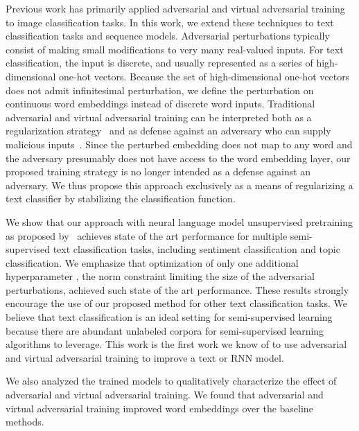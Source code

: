 \documentclass{article}
\begin{document}
Previous work has primarily applied adversarial and virtual adversarial training to image
classification tasks.
In this work, we extend these techniques to text
classification tasks and sequence models.
Adversarial perturbations typically consist of making small modifications to very
many real-valued inputs.
For text classification, the input is discrete, and usually represented as
a series of high-dimensional one-hot vectors.
Because the set of high-dimensional one-hot vectors does not admit infinitesimal
perturbation, we define the perturbation on continuous word embeddings instead of discrete
word inputs.
Traditional adversarial and virtual adversarial training can be interpreted both as a regularization
strategy~\cite[]{szegedy2013intriguing, goodfellow2014explaining,
miyato2015distributional} and as defense against an adversary who can supply
malicious inputs~\cite[]{szegedy2013intriguing,goodfellow2014explaining}.
Since the perturbed embedding does not map to any word and the adversary
presumably does not have access to the word embedding layer,
our proposed training strategy is no longer intended as a defense against an
adversary. 
We thus propose this approach exclusively as a means of regularizing a text
classifier by stabilizing the classification function.

We show that our approach with neural language model
unsupervised pretraining as proposed by~\citet{dai2015semi} achieves state of the art performance for multiple
semi-supervised text classification tasks, including sentiment classification and topic classification.
We emphasize that optimization of only one additional
hyperparameter , the norm constraint
limiting the size of the adversarial perturbations, achieved such state of the art performance.
These results strongly encourage the use of our proposed method for other text classification
tasks.
We believe that text classification is an ideal setting for semi-supervised learning
because there are abundant unlabeled corpora for semi-supervised learning algorithms to leverage.
This work is the first work we know of to use adversarial and virtual
adversarial training to improve a text or RNN model.

We also analyzed the trained models to qualitatively characterize the effect of
adversarial and virtual adversarial training.
We found that adversarial and virtual adversarial training improved
word embeddings over the baseline methods.
\end{document}
